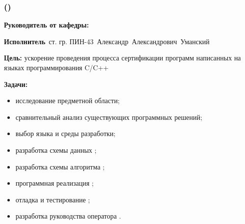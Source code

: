 \begin{frame}
    \frametitle{\textbf{\thesisTitle \textcolor{black}{({\ProgModule})}} }
\textbf{Руководитель от кафедры:}~\supervisorRegaliaShort~\supervisorFioShort

\textbf{Исполнитель}~ст. гр. ПИН-43~Александр~Александрович~Уманский

\textbf{Цель:} ускорение проведения процесса сертификации программ написанных на языках программирования C/C++

\textbf{Задачи:}
\begin{itemize}
    \item исследование предметной области;
    \item сравнительный анализ существующих программных решений;
    \item выбор языка и среды разработки;
    \item разработка схемы данных {\ProgModule};
    \item разработка схемы алгоритма {\ProgModule};
    \item программная реализация {\ProgModule};
    \item отладка и тестирование {\ProgModule};
    \item разработка руководства оператора {\ProgModule}.
\end{itemize}
\end{frame}
